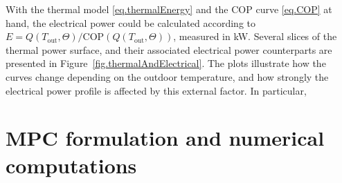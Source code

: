 With the thermal model \eqref{eq.thermalEnergy} and the COP curve \eqref{eq.COP} at hand, the electrical power could be calculated according to $E = Q(T_\text{out},\Theta)/\text{COP}(Q(T_\text{out},\Theta))$, measured in kW. Several slices of the thermal power surface, and their associated electrical power counterparts are presented in Figure~\ref{fig.thermalAndElectrical}. The plots illustrate how the curves change depending on the outdoor temperature, and how strongly the electrical power profile is affected by this external factor. In particular, 

\section{MPC formulation and numerical computations}


